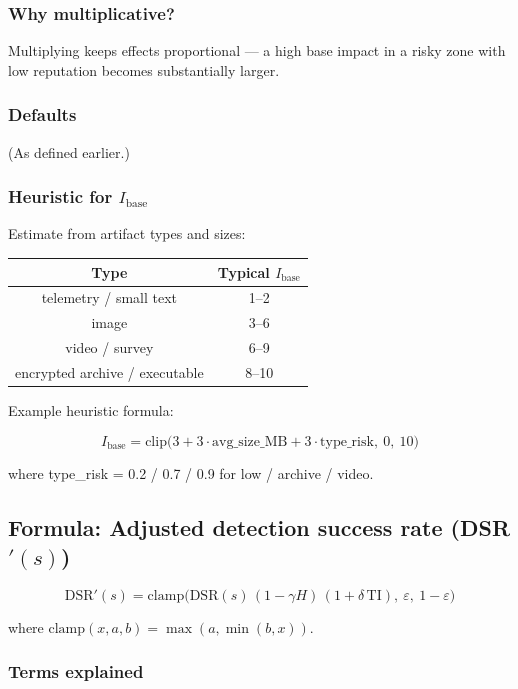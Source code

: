 \documentclass[12pt, a4paper]{report}
\begin{document}
\subsubsection*{Why multiplicative?}

Multiplying keeps effects proportional — a high base impact in a risky zone with low reputation becomes substantially larger.

\subsubsection*{Defaults}

(As defined earlier.)

\subsubsection*{Heuristic for $I_{\text{base}}$}

Estimate from artifact types and sizes:

\begin{table}[h!]
\centering
\begin{tabular}{|c|c|}
\hline
Type & Typical $I_{\text{base}}$ \\ \hline
telemetry / small text & 1--2 \\ \hline
image & 3--6 \\ \hline
video / survey & 6--9 \\ \hline
encrypted archive / executable & 8--10 \\ \hline
\end{tabular}
\end{table}

Example heuristic formula:

\[
I_{\text{base}} = \mathrm{clip}\big( 3 + 3 \cdot \text{avg\_size\_MB} + 3 \cdot \text{type\_risk},\ 0,\ 10 \big)
\]

where type\_risk = 0.2 / 0.7 / 0.9 for low / archive / video.


\subsection{Formula: Adjusted detection success rate (DSR$'(s)$)}

\[
\mathrm{DSR}'(s) =
\mathrm{clamp}\Big( \mathrm{DSR}(s)\,(1 - \gamma H)\,(1 + \delta\,\mathrm{TI}),\ \varepsilon,\ 1 - \varepsilon \Big)
\]

where $\mathrm{clamp}(x,a,b)=\max(a,\min(b,x))$.

\subsubsection*{Terms explained}
\end{document}
